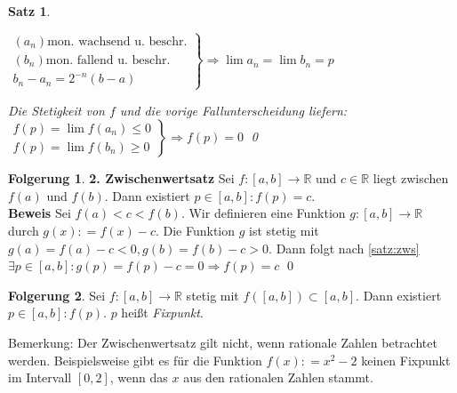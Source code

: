 \documentclass[ngerman,titlepage,twoside, parskip=half*]{scrreprt}
\newcommand*{\R}{\mathbb{R}}
\theoremstyle{plain}
\newtheorem{theorem}{Satz}[section]
\theoremstyle{definition}
\newtheorem{Folg}{Folgerung}
\theoremstyle{remark}
\newcommand*{\coloneqq}{\mathrel{\mathop:}=}
\begin{document}
\begin{theorem}
\begin{enumerate}[1. F{a}ll]
\begin{enumerate}[(i)]
    \end{enumerate}
    $\left.\begin{array}{rcl}
      (a_n) \text{mon. wachsend u. beschr.}\\
      (b_n) \text{mon. fallend u. beschr.}\\
      b_n-a_n=2^{-n}(b-a)
    \end{array}\right\}\Rightarrow \lim a_n=\lim b_n=p$
\end{enumerate}
Die Stetigkeit von $f$ und die vorige Fallunterscheidung liefern:\\
$\left.\begin{array}{rcl}
  f(p)=\lim f(a_n)\leq 0\\
  f(p)=\lim f(b_n)\geq 0
\end{array}\right\}\Rightarrow f(p)=0$
\qed
\end{theorem}

\begin{Folg}
\textbf{2. Zwischenwertsatz} Sei $f\colon[a,b]\rightarrow\R$ und $c\in \R$ liegt zwischen $f(a)$ und $f(b)$. Dann existiert
$p\in[a,b]\colon f(p)=c$.\\
\textbf{Beweis} Sei $f(a)<c<f(b)$. Wir definieren eine Funktion
  $g\colon[a,b]\rightarrow \R$ durch $g(x)\coloneqq f(x)-c$. Die
Funktion $g$ ist stetig mit $g(a)=f(a)-c<0, g(b)=f(b)-c>0$. Dann folgt nach \autoref{satz:zws} $\exists p\in[a,b]
\colon g(p)=f(p)-c=0\Rightarrow f(p)=c$
\qed
\end{Folg}

\begin{Folg}
Sei $f\colon[a,b]\rightarrow\R$ stetig mit $f([a,b])\subset [a,b]$. Dann existiert $p\in [a,b]\colon f(p)$. $p$ heißt
\emph{Fixpunkt}.
\end{Folg}

Bemerkung: Der Zwischenwertsatz gilt nicht, wenn rationale Zahlen betrachtet werden. Beispielsweise gibt es für
die Funktion $f(x)\coloneqq x^2-2$ keinen Fixpunkt im Intervall $[0,2]$, wenn das $x$ aus den rationalen Zahlen stammt.
\end{document}
